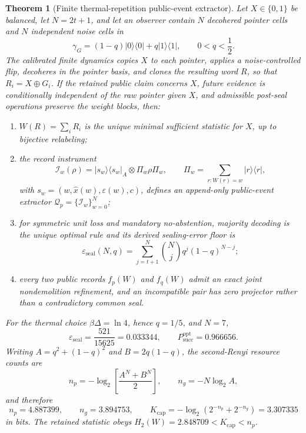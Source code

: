 \documentclass[11pt]{article}
\theoremstyle{plain}
\newtheorem{theorem}{Theorem}[section]
\theoremstyle{definition}
\theoremstyle{remark}
\begin{document}
\begin{theorem}[Finite thermal-repetition public-event extractor]
Let \(X\in\{0,1\}\) be balanced, let \(N=2t+1\), and let an observer contain \(N\) decohered pointer cells and \(N\) independent noise cells in
\[
\gamma_G=(1-q)\lvert0\rangle\!\langle0\rvert+q\lvert1\rangle\!\langle1\rvert,
\qquad 0<q<\frac12.
\]
The calibrated finite dynamics copies \(X\) to each pointer, applies a noise-controlled flip, decoheres in the pointer basis, and clones the resulting word \(R\), so that \(R_i=X\oplus G_i\). If the retained public claim concerns \(X\), future evidence is conditionally independent of the raw pointer given \(X\), and admissible post-seal operations preserve the weight blocks, then:
\begin{enumerate}[leftmargin=*]
\item \(W(R)=\sum_iR_i\) is the unique minimal sufficient statistic for \(X\), up to bijective relabeling;
\item the record instrument
\[
\mathcal I_w(\rho)
=
\lvert s_w\rangle\!\langle s_w\rvert_A\otimes\Pi_w\rho\Pi_w,
\qquad
\Pi_w=\sum_{r:W(r)=w}\lvert r\rangle\!\langle r\rvert,
\]
with \(s_w=(w,\widehat x(w),\varepsilon(w),c)\), defines an append-only public-event extractor \(\mathcal Q_p=\{\mathcal I_w\}_{w=0}^{N}\);
\item for symmetric unit loss and mandatory no-abstention, majority decoding is the unique optimal rule and its derived sealing-error floor is
\[
\varepsilon_{\mathrm{seal}}(N,q)
=
\sum_{j=t+1}^{N}\binom Nj q^j(1-q)^{N-j};
\]
\item every two public records \(f_p(W)\) and \(f_q(W)\) admit an exact joint nondemolition refinement, and an incompatible pair has zero projector rather than a contradictory common seal.
\end{enumerate}
For the thermal choice \(\beta\Delta=\ln4\), hence \(q=1/5\), and \(N=7\),
\[
\varepsilon_{\mathrm{seal}}=\frac{521}{15625}=0.033344,
\qquad
P_{\mathrm{succ}}^{\mathrm{opt}}=0.966656.
\]
Writing \(A=q^2+(1-q)^2\) and \(B=2q(1-q)\), the second-Renyi resource counts are
\[
n_p=-\log_2\!\left[\frac{A^N+B^N}{2}\right],
\qquad
n_g=-N\log_2 A,
\]
and therefore
\[
n_p=4.887399,\qquad
n_g=3.894753,\qquad
K_{\mathrm{cap}}=-\log_2(2^{-n_p}+2^{-n_g})=3.307335
\]
in bits. The retained statistic obeys \(H_2(W)=2.848709<K_{\mathrm{cap}}<n_p\).
\end{theorem}
\end{document}
